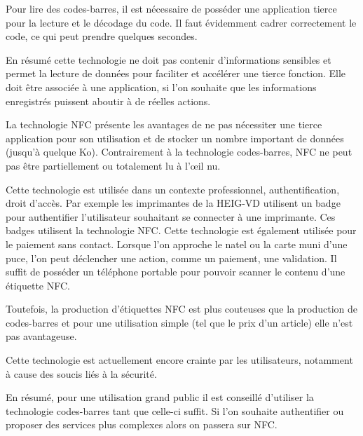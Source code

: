 \documentclass[francais,12pt]{article}
\begin{document}
	Pour lire des codes-barres, il est nécessaire de posséder une application tierce pour la lecture et le décodage du code. Il faut évidemment cadrer correctement le code, ce qui peut prendre quelques secondes.
	
	En résumé cette technologie ne doit pas contenir d'informations sensibles et permet la lecture de données pour faciliter et accélérer une tierce fonction. Elle doit être associée à une application, si l'on souhaite que les informations enregistrés puissent aboutir à de réelles actions.
	
	La technologie NFC présente les avantages de ne pas nécessiter une tierce application pour son utilisation et de stocker un nombre important de données (jusqu'à quelque Ko). Contrairement à la technologie codes-barres, NFC ne peut pas être partiellement ou totalement lu à l'œil nu. 
	
	Cette technologie est utilisée dans un contexte professionnel, authentification, droit d'accès. Par exemple les imprimantes de la HEIG-VD utilisent un badge pour authentifier l'utilisateur souhaitant se connecter à une imprimante. Ces badges utilisent la technologie NFC. Cette technologie est également utilisée pour le paiement sans contact. Lorsque l'on approche le natel ou la carte muni d'une puce, l'on peut déclencher une action, comme un paiement, une validation.	
	Il suffit de posséder un téléphone portable pour pouvoir scanner le contenu d'une étiquette NFC. 
	
	Toutefois, la production d'étiquettes NFC est plus couteuses que la production de codes-barres et pour une utilisation simple (tel que le prix d'un article) elle n'est pas avantageuse. 
	
	Cette technologie est actuellement encore crainte par les utilisateurs, notamment à cause des soucis liés à la sécurité. 	
	
	En résumé, pour une utilisation grand public il est conseillé d'utiliser la technologie codes-barres tant que celle-ci suffit. Si l'on souhaite authentifier ou proposer des services plus complexes alors on passera sur NFC.
		
\end{document}

